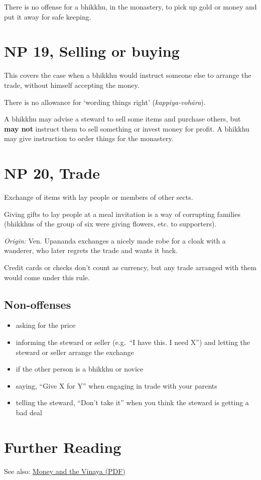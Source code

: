 There is no offense for a bhikkhu, in the monastery, to pick up gold or
money and put it away for safe keeping.

\section{NP 19, Selling or buying}

This covers the case when a bhikkhu would instruct someone else to
arrange the trade, without himself accepting the money.

There is no allowance for `wording things right'
(\emph{kappiya-vohāra}).

A bhikkhu may advise a steward to sell some items and purchase others,
but \textbf{may not} instruct them to sell something or invest money for
profit. A bhikkhu may give instruction to order things for the
monastery.

\section{NP 20, Trade}

Exchange of items with lay people or members of other sects.

Giving gifts to lay people at a meal invitation is a way of corrupting
families (bhikkhus of the group of six were giving flowers, etc. to
supporters).

\emph{Origin:} Ven. Upananda exchanges a nicely made robe for a cloak
with a wanderer, who later regrets the trade and wants it back.

Credit cards or checks don't count as currency, but any trade arranged
with them would come under this rule.

\enlargethispage*{\baselineskip}

\subsection{Non-offenses}

\begin{itemize}
\tightlist
\item
  asking for the price
\item
  informing the steward or seller (e.g.~``I have this. I need X'') and
  letting the steward or seller arrange the exchange
\item
  if the other person is a bhikkhu or novice
\item
  saying, ``Give X for Y'' when engaging in trade with your parents
\item
  telling the steward, ``Don't take it'' when you think the steward is
  getting a bad deal
\end{itemize}

\section{Further Reading}

See also:
\href{https://vinaya-class.github.io/includes/docs/money-and-the-vinaya.pdf}{Money
and the Vinaya (PDF)}

